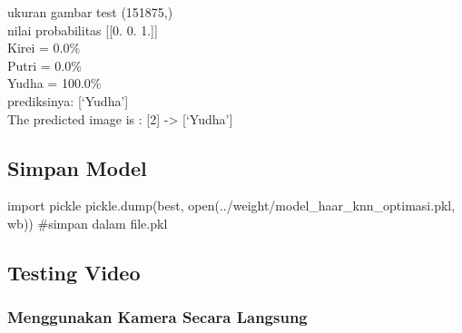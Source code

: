 \documentclass[
  letterpaper,
  DIV=11,
  numbers=noendperiod]{scrreprt}
\newenvironment{Shaded}{\begin{snugshade}}{\end{snugshade}}
\newcommand{\BuiltInTok}[1]{\textcolor[rgb]{0.00,0.23,0.31}{#1}}
\newcommand{\CommentTok}[1]{\textcolor[rgb]{0.37,0.37,0.37}{#1}}
\newcommand{\ImportTok}[1]{\textcolor[rgb]{0.00,0.46,0.62}{#1}}
\newcommand{\NormalTok}[1]{\textcolor[rgb]{0.00,0.23,0.31}{#1}}
\newcommand{\StringTok}[1]{\textcolor[rgb]{0.13,0.47,0.30}{#1}}
\begin{document}
ukuran gambar test (151875,)\\
nilai probabilitas {[}{[}0. 0. 1.{]}{]}\\
Kirei = 0.0\%\\
Putri = 0.0\%\\
Yudha = 100.0\%\\
prediksinya: {[}`Yudha'{]}\\
The predicted image is : {[}2{]} -\textgreater{} {[}`Yudha'{]}

\hypertarget{simpan-model-1}{%
\subsection*{Simpan Model}\label{simpan-model-1}}

\begin{Shaded}
\begin{Highlighting}[]
\ImportTok{import}\NormalTok{ pickle}
\NormalTok{pickle.dump(best, }\BuiltInTok{open}\NormalTok{(}\StringTok{\textquotesingle{}../weight/model\_haar\_knn\_optimasi.pkl\textquotesingle{}}\NormalTok{, }\StringTok{\textquotesingle{}wb\textquotesingle{}}\NormalTok{)) }\CommentTok{\#simpan dalam file.pkl}
\end{Highlighting}
\end{Shaded}

\hypertarget{testing-video}{%
\subsection*{Testing Video}\label{testing-video}}

\hypertarget{menggunakan-kamera-secara-langsung}{%
\subsubsection*{Menggunakan Kamera Secara
Langsung}\label{menggunakan-kamera-secara-langsung}}
\end{document}
